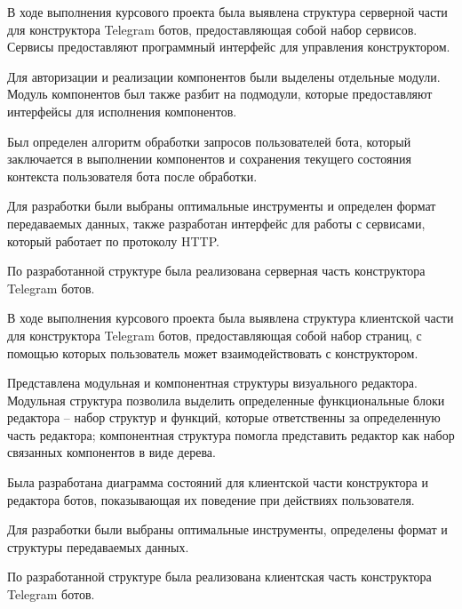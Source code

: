 \newpage


В ходе выполнения курсового проекта была выявлена структура
серверной части для конструктора Telegram ботов, предоставляющая собой
набор сервисов. Сервисы предоставляют программный интерфейс для
управления конструктором.

Для авторизации и реализации компонентов были выделены отдельные
модули. Модуль компонентов был также разбит на подмодули, которые
предоставляют интерфейсы для исполнения компонентов.

Был определен алгоритм обработки запросов пользователей бота,
который заключается в выполнении компонентов и сохранения текущего
состояния контекста пользователя бота после обработки.

Для разработки были выбраны оптимальные инструменты и определен
формат передаваемых данных, также разработан интерфейс для работы с
сервисами, который работает по протоколу HTTP.

По разработанной структуре была реализована серверная часть
конструктора Telegram ботов.


В ходе выполнения курсового проекта была выявлена структура
клиентской части для конструктора Telegram ботов, предоставляющая собой
набор страниц, с помощью которых пользователь может взаимодействовать с
конструктором.

Представлена модульная и компонентная структуры визуального
редактора. Модульная структура позволила выделить определенные
функциональные блоки редактора – набор структур и функций, которые
ответственны за определенную часть редактора; компонентная структура
помогла представить редактор как набор связанных компонентов в виде
дерева.

Была разработана диаграмма состояний для клиентской части
конструктора и редактора ботов, показывающая их поведение при действиях
пользователя.

Для разработки были выбраны оптимальные инструменты, определены
формат и структуры передаваемых данных.

По разработанной структуре была реализована клиентская часть
конструктора Telegram ботов.
